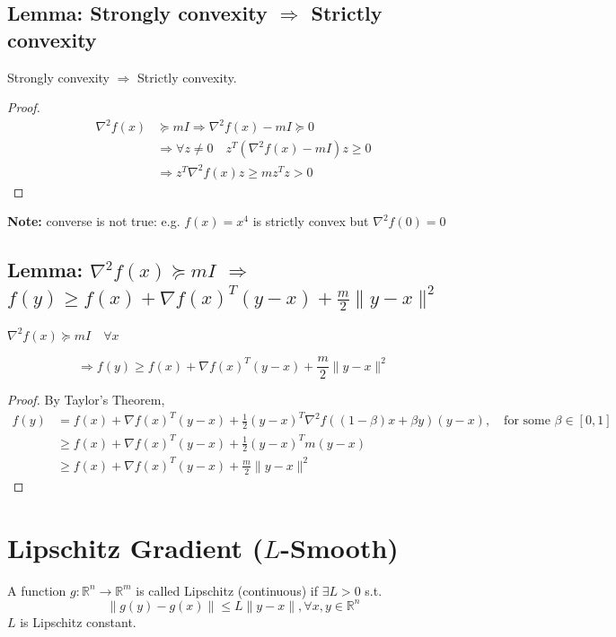\documentclass[11pt]{elegantbook}
\begin{document}
\subsection{Lemma: Strongly convexity $\Rightarrow$ Strictly convexity}
\begin{lemma}
    Strongly convexity $\Rightarrow$ Strictly convexity.
\end{lemma}
\begin{proof}
\begin{equation}
    \begin{aligned}
        \nabla^2 f(x)&\succeq mI \Rightarrow \nabla^2 f(x)-mI\succeq 0\\
        & \Rightarrow \forall z\neq 0\quad z^T(\nabla^2 f(x)-mI)z\geq 0\\
        & \Rightarrow z^T\nabla^2 f(x)z\geq mz^Tz>0
    \end{aligned}
    \nonumber
\end{equation}
\end{proof}
\textbf{Note: }converse is not true: e.g. $f(x)=x^4$ is strictly convex but $\nabla^2 f(0)=0$

\subsection{Lemma: $\nabla^2 f(x)\succeq mI$ $\Rightarrow$ $f(y)\geq f(x)+\nabla f(x)^T(y-x)+\frac{m}{2}\|y-x\|^2$}
\begin{lemma}
$\nabla^2 f(x)\succeq mI\quad \forall x$

$$\Rightarrow f(y)\geq f(x)+\nabla f(x)^T(y-x)+\frac{m}{2}\|y-x\|^2$$
\end{lemma}
\begin{proof}
    By Taylor's Theorem,
    \begin{equation}
        \begin{aligned}
            f(y)&=f(x)+\nabla f(x)^T(y-x)+\frac{1}{2}(y-x)^T \nabla^2 f((1-\beta)x+\beta y)(y-x),\quad \text{for some }\beta\in[0,1]\\
            &\geq f(x)+\nabla f(x)^T(y-x)+\frac{1}{2}(y-x)^Tm(y-x)\\
            &\geq f(x)+\nabla f(x)^T(y-x)+\frac{m}{2}\|y-x\|^2
        \end{aligned}
        \nonumber
    \end{equation}
\end{proof}



\section{Lipschitz Gradient ($L$-Smooth)}
\begin{definition}
A function $g: \mathbb{R}^n \rightarrow	\mathbb{R}^m$ is called Lipschitz (continuous) if $\exists L>0$ s.t.
$$\|g(y)-g(x)\|\leq L\|y-x\|,\forall x,y\in \mathbb{R}^n$$
$L$ is Lipschitz constant.
\end{definition}
\end{document}
